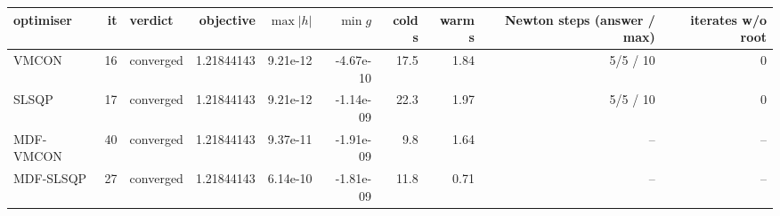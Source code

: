 \begin{tabular}{lrlrrrrrrr}
\toprule
optimiser & it & verdict & objective & $\max|h|$ & $\min g$ & cold s & warm s & Newton steps (answer / max) & iterates w/o root \\
\midrule
VMCON & 16 & converged & 1.21844143 & 9.21e-12 & -4.67e-10 & 17.5 & 1.84 & 5/5 / 10 & 0 \\
SLSQP & 17 & converged & 1.21844143 & 9.21e-12 & -1.14e-09 & 22.3 & 1.97 & 5/5 / 10 & 0 \\
MDF-VMCON & 40 & converged & 1.21844143 & 9.37e-11 & -1.91e-09 & 9.8 & 1.64 & -- & -- \\
MDF-SLSQP & 27 & converged & 1.21844143 & 6.14e-10 & -1.81e-09 & 11.8 & 0.71 & -- & -- \\
\bottomrule
\end{tabular}
